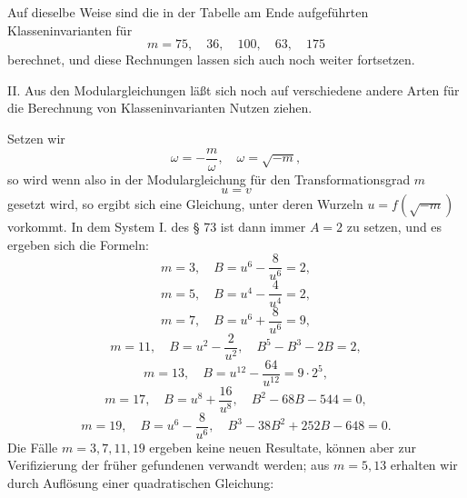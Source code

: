 Auf dieselbe Weise sind die in der Tabelle am Ende aufgeführten
Klasseninvarianten für
\[
m=75,\quad 36,\quad 100,\quad 63,\quad 175
\]
berechnet, und diese Rechnungen lassen sich auch noch weiter
fortsetzen.

II. Aus den  Modulargleichungen läßt sich noch auf
verschiedene andere Arten für die Berechnung von Klasseninvarianten
Nutzen ziehen.

Setzen wir
\[
\omega=-\frac{m}{\omega},\quad \omega=\sqrt{-m},
\]
so wird
wenn also in der Modulargleichung für den Transformationsgrad $m$
\[
u=v
\]
gesetzt wird, so ergibt sich eine Gleichung, unter deren Wurzeln
$u=f(\sqrt{-m})$ vorkommt. In dem System I. des § 73 ist dann
immer $A=2$ zu setzen, und es ergeben sich die Formeln:
\[
m=3,\quad B=u^6-\frac{8}{u^6}=2,
\]
\[
m=5,\quad B=u^4-\frac{4}{u^4}=2,
\]
\[
m=7,\quad B=u^6+\frac{8}{u^6}=9,
\]
\[
m=11,\quad B=u^2-\frac{2}{u^2},\quad B^5-B^3-2B=2,
\]
\[
m=13,\quad B=u^{12}-\frac{64}{u^{12}}=9\cdot2^5,
\]
\[
m=17,\quad B=u^8+\frac{16}{u^8},\quad B^2-68B-544=0,
\]
\[
m=19,\quad B=u^6-\frac{8}{u^6},\quad B^3-38B^2+252B-648=0.
\]
Die Fälle $m=3,7,11,19$ ergeben keine neuen Resultate, können
aber zur Verifizierung der früher gefundenen verwandt werden;
aus $m=5,13$ erhalten wir durch Auflösung einer
quadratischen Gleichung:
